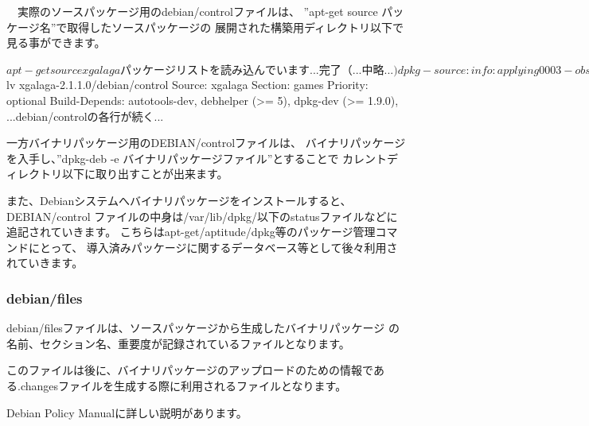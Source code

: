 \documentclass[mingoth,a4paper]{jsarticle}
\begin{document}
　実際のソースパッケージ用のdebian/controlファイルは、
''apt-get source パッケージ名''で取得したソースパッケージの
展開された構築用ディレクトリ以下で見る事ができます。

\begin{commandline}
$ apt-get source xgalaga
パッケージリストを読み込んでいます... 完了
（...中略...)
dpkg-source: info: applying 0003-obsolete-xf86dga.patch
$ lv xgalaga-2.1.1.0/debian/control
Source: xgalaga
Section: games
Priority: optional
Build-Depends: autotools-dev,
               debhelper (>= 5),
               dpkg-dev (>= 1.9.0),
...debian/controlの各行が続く...
\end{commandline}

 一方バイナリパッケージ用のDEBIAN/controlファイルは、
バイナリパッケージを入手し、''dpkg-deb -e バイナリパッケージファイル''とすることで
カレントディレクトリ以下に取り出すことが出来ます。


 また、Debianシステムへバイナリパッケージをインストールすると、DEBIAN/control
ファイルの中身は/var/lib/dpkg/以下のstatusファイルなどに追記されていきます。
こちらはapt-get/aptitude/dpkg等のパッケージ管理コマンドにとって、
導入済みパッケージに関するデータベース等として後々利用されていきます。

\subsubsection{debian/files}

  debian/filesファイルは、ソースパッケージから生成したバイナリパッケージ
 の名前、セクション名、重要度が記録されているファイルとなります。

  このファイルは後に、バイナリパッケージのアップロードのための情報であ
 る.changesファイルを生成する際に利用されるファイルとなります。

 Debian Policy Manual\cite{debpolicy}に詳しい説明があります。
\end{document}
